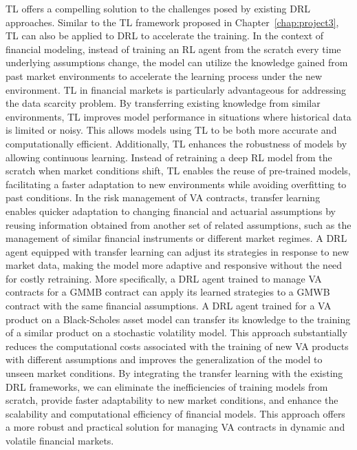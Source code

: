 TL offers a compelling solution to the challenges posed by existing DRL approaches. 
Similar to the TL framework proposed in Chapter~\ref{chap:project3}, TL can also be applied to DRL to accelerate the training.
In the context of financial modeling, instead of training an RL agent from the scratch every time underlying assumptions change, the model can utilize the knowledge gained from past market environments to accelerate the learning process under the new environment.
TL in financial markets is particularly advantageous for addressing the data scarcity problem. 
By transferring existing knowledge from similar environments, TL improves model performance in situations where historical data is limited or noisy. 
This allows models using TL to be both more accurate and computationally efficient. 
Additionally, TL enhances the robustness of models by allowing continuous learning. 
Instead of retraining a deep RL model from the scratch when market conditions shift, TL enables the reuse of pre-trained models, facilitating a faster adaptation to new environments while avoiding overfitting to past conditions.
In the risk management of VA contracts, transfer learning enables quicker adaptation to changing financial and actuarial assumptions by reusing information obtained from another set of related assumptions, such as the management of similar financial instruments or different market regimes. 
A DRL agent equipped with transfer learning can adjust its strategies in response to new market data, making the model more adaptive and responsive without the need for costly retraining.
More specifically, a DRL agent trained to manage VA contracts for a GMMB contract can apply its learned strategies to a GMWB contract with the same financial assumptions. 
A DRL agent trained for a VA product on a Black-Scholes asset model can transfer its knowledge to the training of a similar product on a stochastic volatility model.
This approach substantially reduces the computational costs associated with the training of new VA products with different assumptions and improves the generalization of the model to unseen market conditions.
By integrating the transfer learning with the existing DRL frameworks, we can eliminate the inefficiencies of training models from scratch, provide faster adaptability to new market conditions, and enhance the scalability and computational efficiency of financial models. 
This approach offers a more robust and practical solution for managing VA contracts in dynamic and volatile financial markets.

